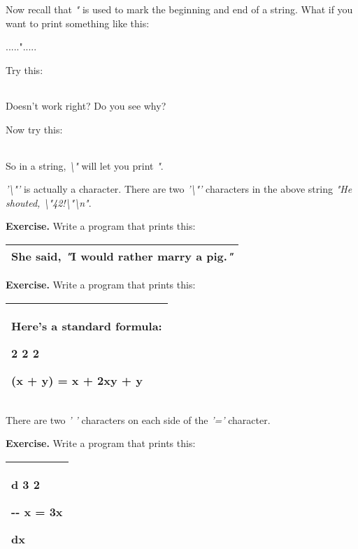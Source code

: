 \documentclass[
]{article}
\begin{document}
Now recall that \emph{"} is used to mark the beginning and end of a
string. What if you want to print something like this:

.....".....

Try this:

\begin{longtable}[]{@{}@{}}
\toprule
\endhead
\bottomrule
\end{longtable}

Doesn't work right? Do you see why?

Now try this:

\begin{longtable}[]{@{}@{}}
\toprule
\endhead
\bottomrule
\end{longtable}

So in a string, \emph{\textbackslash"} will let you print \emph{"}.

\emph{'\textbackslash"'} is actually a character.\emph{ }There are two
\emph{'\textbackslash"'} characters in the above string \emph{"He
shouted, \textbackslash"42!\textbackslash"\textbackslash n"}.

\textbf{Exercise.} Write a program that prints this:

\begin{longtable}[]{@{}l@{}}
\toprule
\endhead
She said, \emph{"}I would rather marry a pig.\emph{"}\tabularnewline
\bottomrule
\end{longtable}

\textbf{Exercise.} Write a program that prints this:

\begin{longtable}[]{@{}l@{}}
\toprule
\endhead
\begin{minipage}[t]{0.97\columnwidth}\raggedright
Here's a standard formula:

2 2 2

(x + y) = x + 2xy + y\strut
\end{minipage}\tabularnewline
\bottomrule
\end{longtable}

There are two \emph{' '} characters on each side of the \emph{'='}
character.

\textbf{Exercise.} Write a program that prints this:

\begin{longtable}[]{@{}l@{}}
\toprule
\endhead
\begin{minipage}[t]{0.97\columnwidth}\raggedright
d 3 2

-\/- x = 3x

dx\strut
\end{minipage}\tabularnewline
\bottomrule
\end{longtable}
\end{document}
